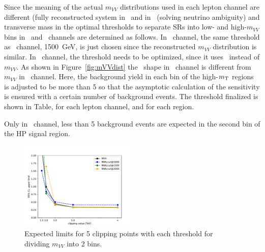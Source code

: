 Since the meaning of the actual $m_{VV}$ distributions used in each lepton channel are different
(fully reconstructed system in \tlep\ and in \olep\ (solving neutrino ambiguity) and transverse mass in \zlep\)
the optimal thresholds to separate SRs into low- and high-$m_{VV}$ bins in \olep\ and \zlep\ channels 
are determined as follows.
In \olep\ channel, the same threshold as \tlep\ channel, 1500~GeV, is just chosen since the reconstructed $m_{VV}$ distribution is similar. 
In \zlep\ channel, the threshold needs to be optimized, since it uses \mt\ instead of $m_{VV}$.
As shown in Figure~\ref{fig:mVVdist} the \mt\ shape in \zlep\ channel is different from $m_{VV}$ in \tlep\ channel.
Here, the background yield in each bin of the high-$m_{\mathrm{T}}$ regions is adjusted to be more than 5 so that
the asymptotic calculation of the sensitivity is ensured with a certain number of background events.
The threshold finalized is shown in Table, for each lepton channel, and for each region.

Only in \tlep\ channel,
less than 5 background events are expected in the second bin of the HP signal region.
%
\begin{figure}[h]
        \centering
    	\includegraphics[width=0.50\textwidth]{figures/aQGC/ClippedFT02bin.pdf}
        \caption{Expected limits for 5 clipping points with each threshold for dividing $m_{VV}$ into 2 bins.}
        \label{fig:ThresholdScan}
\end{figure}

